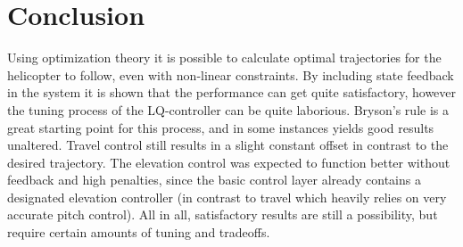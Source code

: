 \section{Conclusion}
Using optimization theory it is possible to calculate optimal trajectories for the helicopter to follow, even with non-linear constraints. By including state feedback in the system it is shown that the performance can get quite satisfactory, however the tuning process of the LQ-controller can be quite laborious. Bryson's rule is a great starting point for this process, and in some instances yields good results unaltered. Travel control still results in a slight constant offset in contrast to the desired trajectory. The elevation control was expected to function better without feedback and high penalties, since the basic control layer already contains a designated elevation controller (in contrast to travel which heavily relies on very accurate pitch control). All in all, satisfactory results are still a possibility, but require certain amounts of tuning and tradeoffs. 
